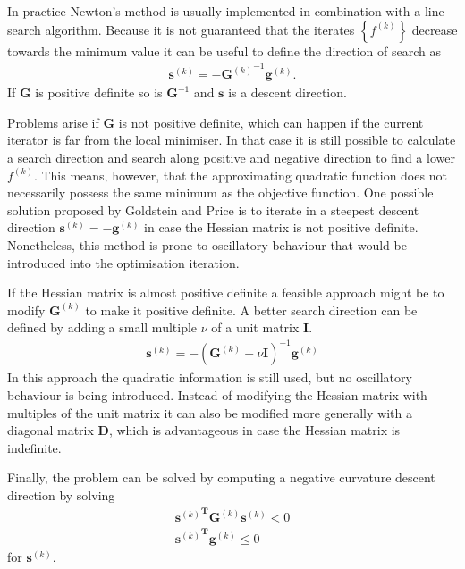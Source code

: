 In practice Newton's method is usually implemented in combination with a
line-search algorithm. Because it is not guaranteed that the iterates
$\left\{f^{(k)}\right\}$ decrease towards the minimum value it can be useful to
define the direction of search as
%
\begin{align}
    \mathbf{s}^{(k)}=-{\mathbf{G}^{(k)}}^{-1}\mathbf{g}^{(k)}.\label{eqn:NewtonRaphsonStep}
\end{align}
%
If $\mathbf{G}$ is positive definite so is $\mathbf{G}^{-1}$ and $\mathbf{s}$ is
a descent direction.

Problems arise if $\mathbf{G}$ is not positive definite, which can happen if
the current iterator is far from the local minimiser. In that case it is still
possible to calculate a search direction and search along positive and negative
direction to find a lower $f^{(k)}$. This means, however, that the
approximating quadratic function does not necessarily possess the same minimum
as the objective function. One possible solution proposed by Goldstein and
Price\autocite{Goldstein_effectivealgorithmminimization_1967} is to iterate in
a steepest descent direction $\mathbf{s}^{(k)}=-\mathbf{g}^{(k)}$ in case the
Hessian matrix is not positive definite. Nonetheless, this method is prone to
oscillatory behaviour that would be introduced into the optimisation iteration.

If the Hessian matrix is almost positive definite a feasible approach might be
to modify $\mathbf{G}^{(k)}$ to make it positive definite. A better search
direction can be defined by adding a small multiple $\nu$ of a unit matrix
$\mathbf{I}$.
\autocite{Levenberg_methodsolutioncertain_1944,Marquardt_AlgorithmLeastSquaresEstimation_1963,Goldfeld_MaximizationQuadraticHillClimbing_1966}
%
\begin{align}
\mathbf{s}^{(k)}=-\left(\mathbf{G}^{(k)}+\nu\mathbf{I}\right)^{-1}\mathbf{g}^{(k)}
\end{align}
%
In this approach the quadratic information is still used, but no oscillatory
behaviour is being introduced. Instead of modifying the Hessian matrix with
multiples of the unit matrix it can also be modified more generally with a
diagonal matrix $\mathbf{D}$, which is advantageous in case the Hessian matrix
is indefinite.
\autocite{Murray_Secondderivativemethods_1972,Hebden_algorithmminimizationusing_1973}

Finally, the problem can be solved by computing a negative curvature descent
direction by solving
%
\begin{align}
    {\mathbf{s}^{(k)}}^\mathbf{T}\mathbf{G}^{(k)}\mathbf{s}^{(k)}<0\\
    {\mathbf{s}^{(k)}}^\mathbf{T}\mathbf{g}^{(k)}\leq0
\end{align}
for $\mathbf{s}^{(k)}$.\autocite{Fiacco_NonlinearProgramming_1990}



